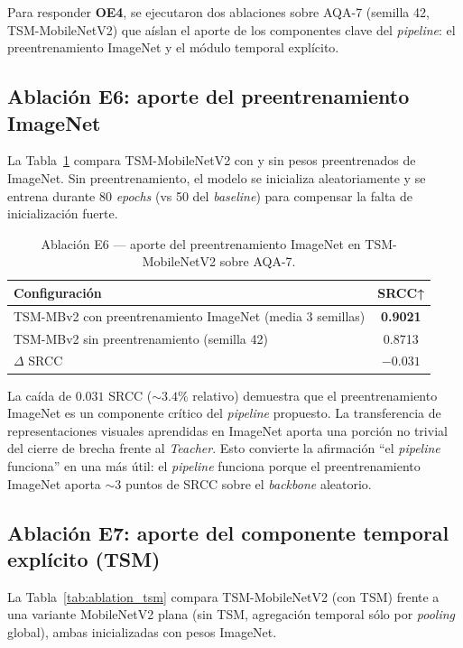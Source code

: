 Para responder \textbf{OE4}, se ejecutaron dos ablaciones sobre AQA-7 (semilla 42, TSM-MobileNetV2) que aíslan el aporte de los componentes clave del \textit{pipeline}: el preentrenamiento ImageNet y el módulo temporal explícito.

\subsection{Ablación E6: aporte del preentrenamiento ImageNet}

La Tabla~\ref{tab:ablation_pretrain} compara TSM-MobileNetV2 con y sin pesos preentrenados de ImageNet. Sin preentrenamiento, el modelo se inicializa aleatoriamente y se entrena durante 80 \textit{epochs} (vs 50 del \textit{baseline}) para compensar la falta de inicialización fuerte.

\begin{table}[H]
\centering
\caption{Ablación E6 — aporte del preentrenamiento ImageNet en TSM-MobileNetV2 sobre AQA-7.}
\label{tab:ablation_pretrain}
\small
\begin{tabular}{lc}
\toprule
\textbf{Configuración} & \textbf{SRCC}↑ \\
\midrule
TSM-MBv2 con preentrenamiento ImageNet (media 3 semillas) & \textbf{0.9021} \\
TSM-MBv2 sin preentrenamiento (semilla 42) & 0.8713 \\
\midrule
$\Delta$ SRCC & $-0.031$ \\
\bottomrule
\end{tabular}
\end{table}

La caída de $0.031$ \ac{SRCC} ($\sim 3.4\%$ relativo) demuestra que el preentrenamiento ImageNet es un componente crítico del \textit{pipeline} propuesto. La transferencia de representaciones visuales aprendidas en ImageNet aporta una porción no trivial del cierre de brecha frente al \textit{Teacher}. Esto convierte la afirmación ``el \textit{pipeline} funciona'' en una más útil: el \textit{pipeline} funciona porque el preentrenamiento ImageNet aporta $\sim 3$ puntos de SRCC sobre el \textit{backbone} aleatorio.

\subsection{Ablación E7: aporte del componente temporal explícito (TSM)}

La Tabla~\ref{tab:ablation_tsm} compara TSM-MobileNetV2 (con \ac{TSM}) frente a una variante MobileNetV2 plana (sin \ac{TSM}, agregación temporal sólo por \textit{pooling} global), ambas inicializadas con pesos ImageNet.

